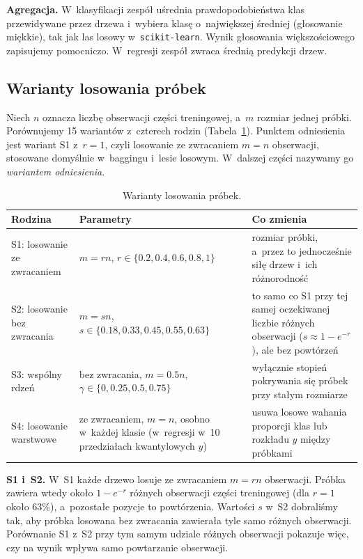 \documentclass[11pt,a4paper]{article}
\begin{document}
\textbf{Agregacja.} W~klasyfikacji zespół uśrednia prawdopodobieństwa klas przewidywane przez drzewa i~wybiera klasę o~największej średniej (głosowanie miękkie), tak jak las losowy w~\texttt{scikit-learn}. Wynik głosowania większościowego zapisujemy pomocniczo. W~regresji zespół zwraca średnią predykcji drzew.

\subsection{Warianty losowania próbek}
\label{sec:warianty}

Niech $n$ oznacza liczbę obserwacji części treningowej, a~$m$ rozmiar jednej próbki. Porównujemy 15 wariantów z~czterech rodzin (Tabela~\ref{tab:warianty}). Punktem odniesienia jest wariant S1 z~$r=1$, czyli losowanie ze zwracaniem $m=n$ obserwacji, stosowane domyślnie w~baggingu i~lesie losowym. W~dalszej części nazywamy go \emph{wariantem odniesienia}.

\begin{table}[!htbp]
\centering\small
\caption{Warianty losowania próbek.}
\label{tab:warianty}
\begin{tabularx}{\textwidth}{>{\raggedright\arraybackslash}p{}>{\raggedright\arraybackslash}p{}X}
\toprule
\textbf{Rodzina} & \textbf{Parametry} & \textbf{Co zmienia} \\
\midrule
S1: losowanie ze zwracaniem & $m=rn$, $r\in\{0.2,0.4,0.6,0.8,1\}$ & rozmiar próbki, a~przez to jednocześnie siłę drzew i~ich różnorodność \\
S2: losowanie bez zwracania & $m=sn$, $s\in\{0.18,0.33,0.45,0.55,0.63\}$ & to samo co S1 przy tej samej oczekiwanej liczbie różnych obserwacji ($s\approx1-e^{-r}$), ale bez powtórzeń \\
S3: wspólny rdzeń & bez zwracania, $m=0.5n$, $\gamma\in\{0,0.25,0.5,0.75\}$ & wyłącznie stopień pokrywania się próbek przy stałym rozmiarze \\
S4: losowanie warstwowe & ze zwracaniem, $m=n$, osobno w~każdej klasie (w~regresji w~10 przedziałach kwantylowych $y$) & usuwa losowe wahania proporcji klas lub rozkładu $y$ między próbkami \\
\bottomrule
\end{tabularx}
\end{table}

\textbf{S1 i~S2.} W~S1 każde drzewo losuje ze zwracaniem $m=rn$ obserwacji. Próbka zawiera wtedy około $1-e^{-r}$ różnych obserwacji części treningowej (dla $r=1$ około 63\%), a~pozostałe pozycje to powtórzenia. Wartości $s$ w~S2 dobraliśmy tak, aby próbka losowana bez zwracania zawierała tyle samo różnych obserwacji. Porównanie S1 z~S2 przy tym samym udziale różnych obserwacji pokazuje więc, czy na wynik wpływa samo powtarzanie obserwacji.
\end{document}
